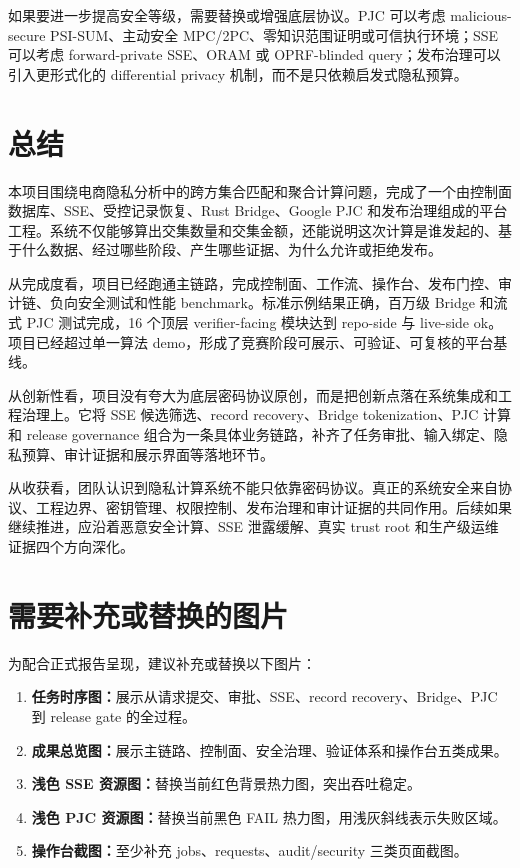 \documentclass[UTF8,a4paper,12pt,oneside]{ctexrep}
\begin{document}
如果要进一步提高安全等级，需要替换或增强底层协议。PJC 可以考虑 malicious-secure PSI-SUM、主动安全 MPC/2PC、零知识范围证明或可信执行环境；SSE 可以考虑 forward-private SSE、ORAM 或 OPRF-blinded query；发布治理可以引入更形式化的 differential privacy 机制，而不是只依赖启发式隐私预算。

\chapter{总结}

本项目围绕电商隐私分析中的跨方集合匹配和聚合计算问题，完成了一个由控制面数据库、SSE、受控记录恢复、Rust Bridge、Google PJC 和发布治理组成的平台工程。系统不仅能够算出交集数量和交集金额，还能说明这次计算是谁发起的、基于什么数据、经过哪些阶段、产生哪些证据、为什么允许或拒绝发布。

从完成度看，项目已经跑通主链路，完成控制面、工作流、操作台、发布门控、审计链、负向安全测试和性能 benchmark。标准示例结果正确，百万级 Bridge 和流式 PJC 测试完成，16 个顶层 verifier-facing 模块达到 repo-side 与 live-side ok。项目已经超过单一算法 demo，形成了竞赛阶段可展示、可验证、可复核的平台基线。

从创新性看，项目没有夸大为底层密码协议原创，而是把创新点落在系统集成和工程治理上。它将 SSE 候选筛选、record recovery、Bridge tokenization、PJC 计算和 release governance 组合为一条具体业务链路，补齐了任务审批、输入绑定、隐私预算、审计证据和展示界面等落地环节。

从收获看，团队认识到隐私计算系统不能只依靠密码协议。真正的系统安全来自协议、工程边界、密钥管理、权限控制、发布治理和审计证据的共同作用。后续如果继续推进，应沿着恶意安全计算、SSE 泄露缓解、真实 trust root 和生产级运维证据四个方向深化。

\appendix

\chapter{需要补充或替换的图片}

为配合正式报告呈现，建议补充或替换以下图片：

\begin{enumerate}
  \item \textbf{任务时序图：}展示从请求提交、审批、SSE、record recovery、Bridge、PJC 到 release gate 的全过程。
  \item \textbf{成果总览图：}展示主链路、控制面、安全治理、验证体系和操作台五类成果。
  \item \textbf{浅色 SSE 资源图：}替换当前红色背景热力图，突出吞吐稳定。
  \item \textbf{浅色 PJC 资源图：}替换当前黑色 FAIL 热力图，用浅灰斜线表示失败区域。
  \item \textbf{操作台截图：}至少补充 jobs、requests、audit/security 三类页面截图。
\end{enumerate}
\end{document}
